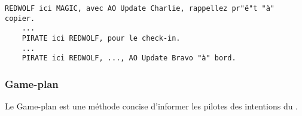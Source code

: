 \begin{e1}
\begin{e2}
\begin{e3}
			\begin{minipage}{\linewidth}
				\begin{lstlisting}[caption=AO Update: code, label=aoupdatecode]
	REDWOLF ici MAGIC, avec AO Update Charlie, rappellez pr"ê"t "à" copier.
	...
	PIRATE ici REDWOLF, pour le check-in.
	...
	PIRATE ici REDWOLF, ..., AO Update Bravo "à" bord.
				\end{lstlisting}
			\end{minipage}
			
		\end{e3}
		
	\end{e2}
	
\end{e1}

\subsubsection{Game-plan}

Le Game-plan est une méthode concise d'informer les pilotes des intentions du \ja{}.


